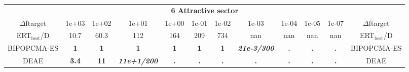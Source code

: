 \begin{tabular}{cccccccccccc}
 & \multicolumn{10}{c}{{\normalsize \textbf{6 Attractive sector}}}\\
$\Delta$ftarget& 1e+03& 1e+02& 1e+01& 1e+00& 1e-01& 1e-02& 1e-03& 1e-04& 1e-05& 1e-07 & $\Delta$ftarget \\
ERT$_{\textrm{best}}$/D& 10.7& 60.3& 112& 164& 209& 734& nan& nan& nan& nan & ERT$_{\textrm{best}}$/D \\
\hline
BIPOPCMA-ES & \textbf{1} & \textbf{1} & \textbf{1} & \textbf{1} & \textbf{1} & \textbf{1} & \textbf{\textit{21e-3}\textit{/300}} & \textbf{.} & \textbf{.} & \textbf{.} & BIPOPCMA-ES \cite{add_an_entry_for_BIPOPCMA-ES_in_bbob.bib}\\
DEAE & \textbf{3.4} & \textbf{11} & \textbf{\textit{11e+1}\textit{/200}} & \textbf{.} & \textbf{.} & \textbf{.} & \textbf{.} & \textbf{.} & \textbf{.} & \textbf{.} & DEAE \cite{add_an_entry_for_DEAE_in_bbob.bib}
\end{tabular}
